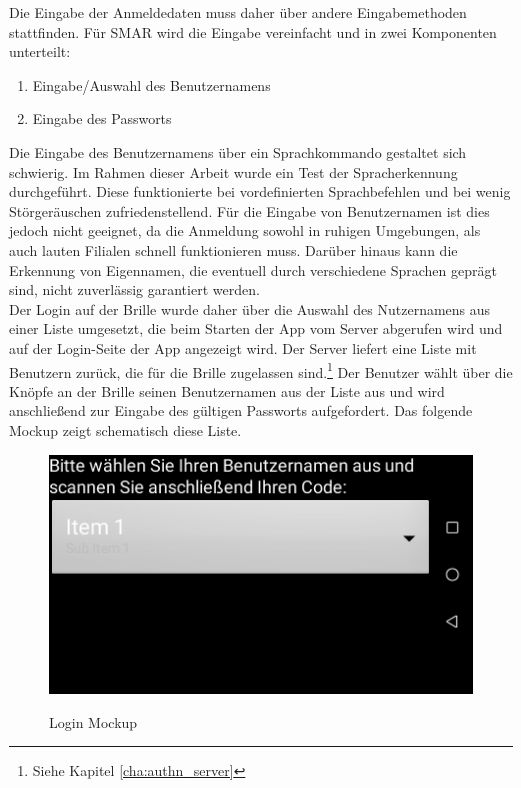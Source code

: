 Die Eingabe der Anmeldedaten muss daher über andere Eingabemethoden stattfinden. Für \acs{SMAR} wird die Eingabe vereinfacht und in zwei Komponenten unterteilt:
\begin{enumerate}
	\item Eingabe/Auswahl des Benutzernamens
	\item Eingabe des Passworts
\end{enumerate}

Die Eingabe des Benutzernamens über ein Sprachkommando gestaltet sich schwierig. Im Rahmen dieser Arbeit wurde ein Test der Spracherkennung durchgeführt. Diese funktionierte bei vordefinierten Sprachbefehlen und bei wenig Störgeräuschen zufriedenstellend. Für die Eingabe von Benutzernamen ist dies jedoch nicht geeignet, da die Anmeldung sowohl in ruhigen Umgebungen, als auch lauten Filialen schnell funktionieren muss. Darüber hinaus kann die Erkennung von Eigennamen, die eventuell durch verschiedene Sprachen geprägt sind, nicht zuverlässig garantiert werden.\\
Der Login auf der Brille wurde daher über die Auswahl des Nutzernamens aus einer Liste umgesetzt, die beim Starten der App vom Server abgerufen wird und auf der Login-Seite der App angezeigt wird. Der Server liefert eine Liste mit Benutzern zurück, die für die Brille zugelassen sind.\footnote{Siehe Kapitel \ref{cha:authn_server} } Der Benutzer wählt über die Knöpfe an der Brille seinen Benutzernamen aus der Liste aus und wird anschließend zur Eingabe des gültigen Passworts aufgefordert. Das folgende Mockup zeigt schematisch diese Liste.\\

\begin{figure}[H]
	\centering
	{\includegraphics[scale=0.7]{Bilder/Abbildungen/login_mockup.png}}
	\caption{Login Mockup}
	\label{fig:sequenz_warenannnahme}
\end{figure}

